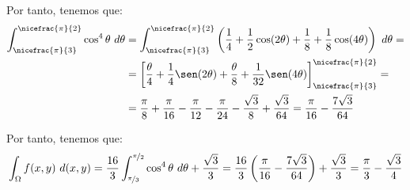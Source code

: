\begin{ejercicio}
    Por tanto, tenemos que:
    \begin{align*}
        \int_{\nicefrac{\pi}{3}}^{\nicefrac{\pi}{2}}\cos^4\theta~d\theta &= \int_{\nicefrac{\pi}{3}}^{\nicefrac{\pi}{2}}\left(\dfrac{1}{4} + \dfrac{1}{2}\cos(2\theta) + \dfrac{1}{8} + \dfrac{1}{8}\cos(4\theta)\right)~d\theta =\\
        &= \left[\dfrac{\theta}{4} + \dfrac{1}{4}\sen(2\theta) + \dfrac{\theta}{8} + \dfrac{1}{32}\sen(4\theta)\right]_{\nicefrac{\pi}{3}}^{\nicefrac{\pi}{2}} =\\
        &= \dfrac{\pi}{8} + \dfrac{\pi}{16} -\dfrac{\pi}{12} - \dfrac{\pi}{24} - \dfrac{\sqrt{3}}{8} + \dfrac{\sqrt{3}}{64}
        = \dfrac{\pi}{16} - \dfrac{7\sqrt{3}}{64}
    \end{align*}

    Por tanto, tenemos que:
    \begin{align*}
        \int_{\Omega} f(x, y)~d(x, y) = \dfrac{16}{3}\int_{\nicefrac{\pi}{3}}^{\nicefrac{\pi}{2}}\cos^4\theta~d\theta + \dfrac{\sqrt{3}}{3} = \dfrac{16}{3}\left(\dfrac{\pi}{16} - \dfrac{7\sqrt{3}}{64}\right) + \dfrac{\sqrt{3}}{3} = \dfrac{\pi}{3} - \dfrac{\sqrt{3}}{4}
    \end{align*}
\end{ejercicio}



